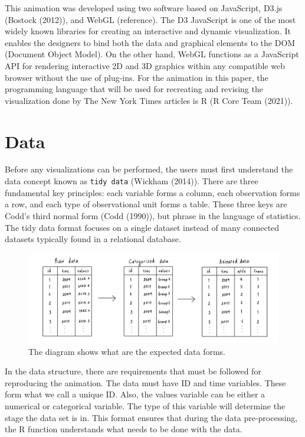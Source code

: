 This animation was developed using two software based on JavaScript, D3.js (Bostock (2012)), and WebGL (reference). The D3 JavaScript is one of the most widely known libraries for creating an interactive and dynamic visualization. It enables the designers to bind both the data and graphical elements to the DOM (Document Object Model). On the other hand, WebGL functions as a JavaScript API for rendering interactive 2D and 3D graphics within any compatible web browser without the use of plug-ins. For the animation in this paper, the programming language that will be used for recreating and revising the visualization done by The New York Times articles is R (R Core Team (2021)).

\hypertarget{data}{%
\section{Data}\label{data}}

Before any visualizations can be performed, the users must first understand the data concept known as \texttt{tidy\ data} (Wickham (2014)). There are three fundamental key principles: each variable forms a column, each observation forms a row, and each type of observational unit forms a table. These three keys are Codd's third normal form (Codd (1990)), but phrase in the language of statistics. The tidy data format focuses on a single dataset instead of many connected datasets typically found in a relational database.

\begin{figure}

{\centering \includegraphics[width=1\linewidth]{figures/data-diagram} 

}

\caption{The diagram shows what are the expected data forms.}\label{fig:data-diagram}
\end{figure}

In the data structure, there are requirements that must be followed for reproducing the animation. The data must have ID and time variables. These form what we call a unique ID. Also, the values variable can be either a numerical or categorical variable. The type of this variable will determine the stage the data set is in. This format ensures that during the data pre-processing, the R function understands what needs to be done with the data.

